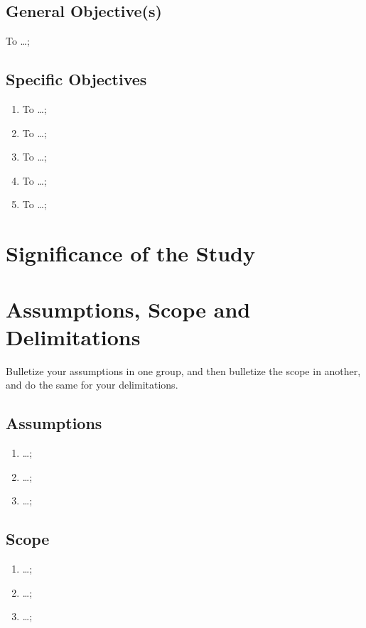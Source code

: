 \subsection{General Objective(s)}
To \ldots;

\subsection{Specific Objectives}

\begin{enumerate}
	\item To  \ldots;
	
	\item To  \ldots;
	
	\item To  \ldots;
	
	\item To  \ldots;
	
	\item To  \ldots;
\end{enumerate}



\section{Significance of the Study}

\textcolor[rgb]{0.75,0.75,0.75}{\blindtext}



\section{Assumptions, Scope and Delimitations}

Bulletize your assumptions in one group, and then bulletize the scope in another, and do the same for your delimitations.

\subsection{Assumptions}
\begin{enumerate}
	\item \ldots;
	
	\item \ldots;
	
	\item \ldots;	
\end{enumerate}

\subsection{Scope}
\begin{enumerate}
	\item \ldots;
	
	\item \ldots;
	
	\item \ldots;	
\end{enumerate}

